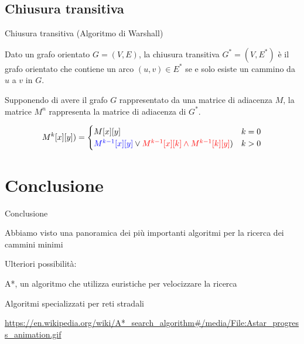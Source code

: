 \subsection{Chiusura transitiva}

\begin{frame}{Chiusura transitiva (Algoritmo di Warshall)}

Dato un grafo orientato $G=(V,E)$, la chiusura transitiva $G^*=(V,E^*)$ è il
grafo orientato che contiene un arco $(u,v) \in E^*$ se e solo esiste un cammino da $u$ a $v$ in $G$.

Supponendo di avere il grafo $G$ rappresentato da una matrice di adiacenza $M$, la matrice
$M^n$ rappresenta la matrice di adiacenza di $G^*$.

\bigskip
{}
\[
  M^k[x][y]) = \begin{cases}
    M[x][y] & k = 0 \\
    {\color{blue}{M^{k-1}[x][y]}} \vee {\color{red} M^{k-1}[x][k] \wedge M^{k-1}[k][y]}) & k>0
  \end{cases}
\]

\end{frame}


\section{Conclusione}

\begin{frame}{Conclusione}

\BIL
\item Abbiamo visto una panoramica dei più importanti algoritmi per la ricerca
dei cammini minimi
\item Ulteriori possibilità:
\BI
\item A*, un algoritmo che utilizza euristiche per velocizzare la ricerca
\item Algoritmi specializzati per reti stradali
\EI
\EIL

\tiny
\url{https://en.wikipedia.org/wiki/A*\_search\_algorithm\#/media/File:Astar\_progress\_animation.gif}

\end{frame}




